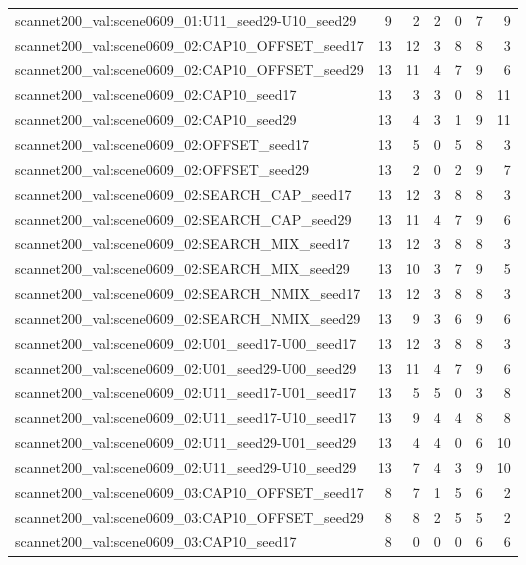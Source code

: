 \begin{table}[t]
\begin{tabular}{lrrrrrr}
scannet200\_val:scene0609\_01:U11\_seed29-U10\_seed29 & 9 & 2 & 2 & 0 & 7 & 9 \\
scannet200\_val:scene0609\_02:CAP10\_OFFSET\_seed17 & 13 & 12 & 3 & 8 & 8 & 3 \\
scannet200\_val:scene0609\_02:CAP10\_OFFSET\_seed29 & 13 & 11 & 4 & 7 & 9 & 6 \\
scannet200\_val:scene0609\_02:CAP10\_seed17 & 13 & 3 & 3 & 0 & 8 & 11 \\
scannet200\_val:scene0609\_02:CAP10\_seed29 & 13 & 4 & 3 & 1 & 9 & 11 \\
scannet200\_val:scene0609\_02:OFFSET\_seed17 & 13 & 5 & 0 & 5 & 8 & 3 \\
scannet200\_val:scene0609\_02:OFFSET\_seed29 & 13 & 2 & 0 & 2 & 9 & 7 \\
scannet200\_val:scene0609\_02:SEARCH\_CAP\_seed17 & 13 & 12 & 3 & 8 & 8 & 3 \\
scannet200\_val:scene0609\_02:SEARCH\_CAP\_seed29 & 13 & 11 & 4 & 7 & 9 & 6 \\
scannet200\_val:scene0609\_02:SEARCH\_MIX\_seed17 & 13 & 12 & 3 & 8 & 8 & 3 \\
scannet200\_val:scene0609\_02:SEARCH\_MIX\_seed29 & 13 & 10 & 3 & 7 & 9 & 5 \\
scannet200\_val:scene0609\_02:SEARCH\_NMIX\_seed17 & 13 & 12 & 3 & 8 & 8 & 3 \\
scannet200\_val:scene0609\_02:SEARCH\_NMIX\_seed29 & 13 & 9 & 3 & 6 & 9 & 6 \\
scannet200\_val:scene0609\_02:U01\_seed17-U00\_seed17 & 13 & 12 & 3 & 8 & 8 & 3 \\
scannet200\_val:scene0609\_02:U01\_seed29-U00\_seed29 & 13 & 11 & 4 & 7 & 9 & 6 \\
scannet200\_val:scene0609\_02:U11\_seed17-U01\_seed17 & 13 & 5 & 5 & 0 & 3 & 8 \\
scannet200\_val:scene0609\_02:U11\_seed17-U10\_seed17 & 13 & 9 & 4 & 4 & 8 & 8 \\
scannet200\_val:scene0609\_02:U11\_seed29-U01\_seed29 & 13 & 4 & 4 & 0 & 6 & 10 \\
scannet200\_val:scene0609\_02:U11\_seed29-U10\_seed29 & 13 & 7 & 4 & 3 & 9 & 10 \\
scannet200\_val:scene0609\_03:CAP10\_OFFSET\_seed17 & 8 & 7 & 1 & 5 & 6 & 2 \\
scannet200\_val:scene0609\_03:CAP10\_OFFSET\_seed29 & 8 & 8 & 2 & 5 & 5 & 2 \\
scannet200\_val:scene0609\_03:CAP10\_seed17 & 8 & 0 & 0 & 0 & 6 & 6 \\

\end{tabular}
\end{table}
